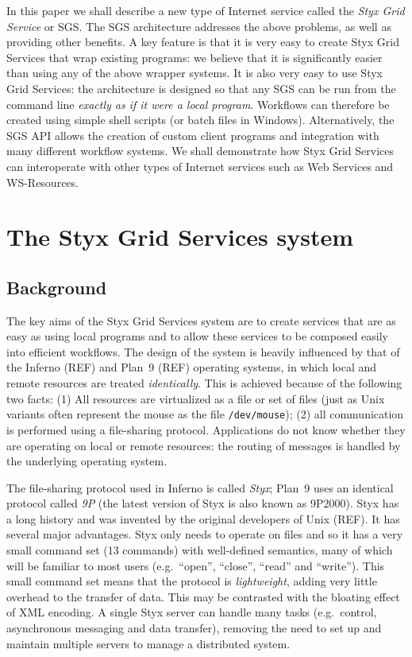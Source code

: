 \documentclass{llncs}
\begin{document}
In this paper we shall describe a new type of Internet service called the {\em Styx Grid Service\/} or SGS.  The SGS architecture addresses the above problems, as well as providing other benefits.  A key feature is that it is very easy to create Styx Grid Services that wrap existing programs: we believe that it is significantly easier than using any of the above wrapper systems.  It is also very easy to use Styx Grid Services: the architecture is designed so that any SGS can be run from the command line {\em exactly as if it were a local program\/}.  Workflows can therefore be created using simple shell scripts (or batch files in Windows).  Alternatively, the SGS API allows the creation of custom client programs and integration with many different workflow systems.  We shall demonstrate how Styx Grid Services can interoperate with other types of Internet services such as Web Services and WS-Resources.

%
\section{The Styx Grid Services system}
\subsection{Background}
The key aims of the Styx Grid Services system are to create services that are as easy as using local programs and to allow these services to be composed easily into efficient workflows.  The design of the system is heavily influenced by that of the Inferno (REF) and Plan~9 (REF) operating systems, in which local and remote resources are treated {\em identically\/}.  This is achieved because of the following two facts: (1) All resources are virtualized as a file or set of files (just as Unix variants often represent the mouse as the file {\tt /dev/mouse}); (2) all communication is performed using a file-sharing protocol.  Applications do not know whether they are operating on local or remote resources: the routing of messages is handled by the underlying operating system.

The file-sharing protocol used in Inferno is called {\em Styx\/}; Plan~9 uses an identical protocol called {\em 9P\/} (the latest version of Styx is also known as 9P2000).  Styx has a long history and was invented by the original developers of Unix (REF).  It has several major advantages.  Styx only needs to operate on files and so it has a very small command set (13 commands) with well-defined semantics, many of which will be familiar to most users (e.g.\ ``open'', ``close'', ``read'' and ``write'').  This small command set means that the protocol is {\em lightweight\/}, adding very little overhead to the transfer of data.  This may be contrasted with the bloating effect of XML encoding.  A single Styx server can handle many tasks (e.g.\ control, asynchronous messaging and data transfer), removing the need to set up and maintain multiple servers to manage a distributed system.
\end{document}
